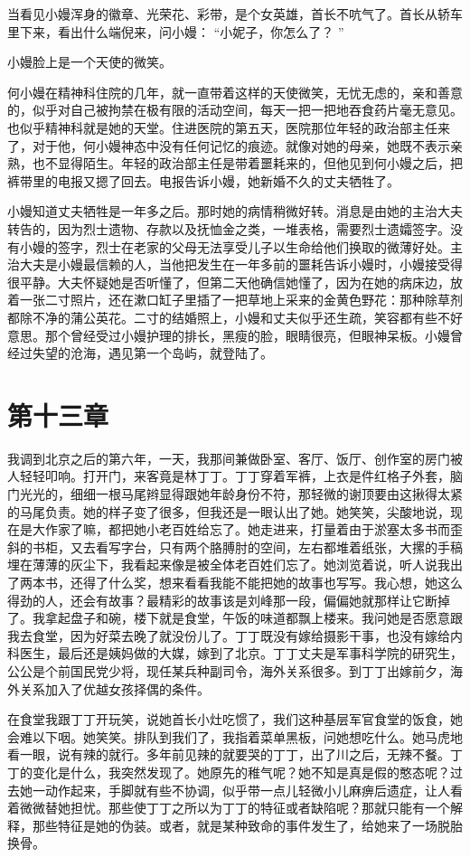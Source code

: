 \documentclass[12pt,twoside,openany]{book}
\begin{document}
当看见小嫚浑身的徽章、光荣花、彩带，是个女英雄，首长不吭气了。首长从轿车里下来，看出什么端倪来，问小嫚： “小妮子，你怎么了？ ”

小嫚脸上是一个天使的微笑。

何小嫚在精神科住院的几年，就一直带着这样的天使微笑，无忧无虑的，亲和善意的，似乎对自己被拘禁在极有限的活动空间，每天一把一把地吞食药片毫无意见。也似乎精神科就是她的天堂。住进医院的第五天，医院那位年轻的政治部主任来了，对于他，何小嫚神态中没有任何记忆的痕迹。就像对她的母亲，她既不表示亲熟，也不显得陌生。年轻的政治部主任是带着噩耗来的，但他见到何小嫚之后，把裤带里的电报又摁了回去。电报告诉小嫚，她新婚不久的丈夫牺牲了。

小嫚知道丈夫牺牲是一年多之后。那时她的病情稍微好转。消息是由她的主治大夫转告的，因为烈士遗物、存款以及抚恤金之类，一堆表格，需要烈士遗孀签字。没有小嫚的签字，烈士在老家的父母无法享受儿子以生命给他们换取的微薄好处。主治大夫是小嫚最信赖的人，当他把发生在一年多前的噩耗告诉小嫚时，小嫚接受得很平静。大夫怀疑她是否听懂了，但第二天他确信她懂了，因为在她的病床边，放着一张二寸照片，还在漱口缸子里插了一把草地上采来的金黄色野花：那种除草剂都除不净的蒲公英花。二寸的结婚照上，小嫚和丈夫似乎还生疏，笑容都有些不好意思。那个曾经受过小嫚护理的排长，黑瘦的脸，眼睛很亮，但眼神呆板。小嫚曾经过失望的沧海，遇见第一个岛屿，就登陆了。

\chapter{第十三章}

我调到北京之后的第六年，一天，我那间兼做卧室、客厅、饭厅、创作室的房门被人轻轻叩响。打开门，来客竟是林丁丁。丁丁穿着军裤，上衣是件红格子外套，脑门光光的，细细一根马尾辫显得跟她年龄身份不符，那轻微的谢顶要由这揪得太紧的马尾负责。她的样子变了很多，但我还是一眼认出了她。她笑笑，尖酸地说，现在是大作家了嘛，都把她小老百姓给忘了。她走进来，打量着由于淤塞太多书而歪斜的书柜，又去看写字台，只有两个胳膊肘的空间，左右都堆着纸张，大摞的手稿埋在薄薄的灰尘下，我看起来像是被全体老百姓们忘了。她浏览着说，听人说我出了两本书，还得了什么奖，想来看看我能不能把她的故事也写写。我心想，她这么得劲的人，还会有故事？最精彩的故事该是刘峰那一段，偏偏她就那样让它断掉了。我拿起盘子和碗，楼下就是食堂，午饭的味道都飘上楼来。我问她是否愿意跟我去食堂，因为好菜去晚了就没份儿了。丁丁既没有嫁给摄影干事，也没有嫁给内科医生，最后还是姨妈做的大媒，嫁到了北京。丁丁丈夫是军事科学院的研究生，公公是个前国民党少将，现任某兵种副司令，海外关系很多。到丁丁出嫁前夕，海外关系加入了优越女孩择偶的条件。

在食堂我跟丁丁开玩笑，说她首长小灶吃惯了，我们这种基层军官食堂的饭食，她会难以下咽。她笑笑。排队到我们了，我指着菜单黑板，问她想吃什么。她马虎地看一眼，说有辣的就行。多年前见辣的就要哭的丁丁，出了川之后，无辣不餐。丁丁的变化是什么，我突然发现了。她原先的稚气呢？她不知是真是假的憨态呢？过去她一动作起来，手脚就有些不协调，似乎带一点儿轻微小儿麻痹后遗症，让人看着微微替她担忧。那些使丁丁之所以为丁丁的特征或者缺陷呢？那就只能有一个解释，那些特征是她的伪装。或者，就是某种致命的事件发生了，给她来了一场脱胎换骨。
\end{document}
